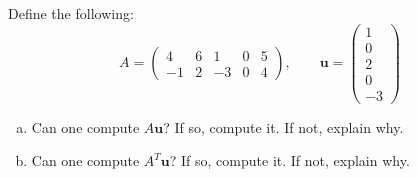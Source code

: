 \documentclass[11pt,letterpaper]{article}
\begin{document}
 Define the following:
	\[
	A= \begin{pmatrix} 4 & 6 & 1 & 0 & 5 \\ -1 & 2 & -3 & 0 & 4 \end{pmatrix}, \qquad
	\mathbf{u}= \begin{pmatrix} 1 \\ 0 \\ 2 \\ 0 \\ -3 \end{pmatrix}
	\]

\begin{enumerate}[(a)]
\item Can one compute $A\mathbf{u}$? If so, compute it. If not, explain why. 
\item Can one compute $A^T\mathbf{u}$? If so, compute it. If not, explain why. 
\end{enumerate}
\end{document}
